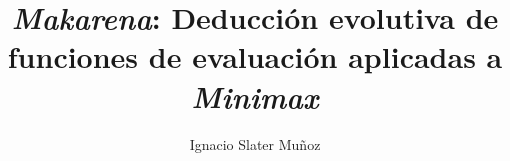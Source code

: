 \providecommand{\event}{} %

\title{\textit{Makarena}: Deducción evolutiva de funciones de evaluación aplicadas a \textit{Minimax}}
\author{Ignacio Slater Muñoz
}


\theoremstyle{definition}
\newtheorem{definition}{Definición}[section]